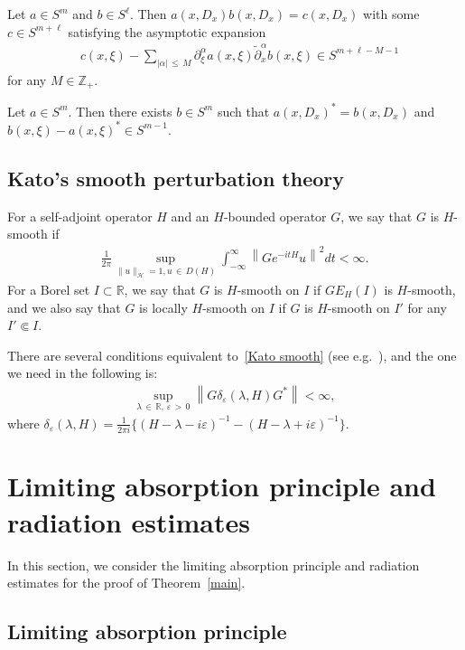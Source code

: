 \documentclass[10pt,a4paper]{amsart}
\renewcommand{\a}{\alpha}
\renewcommand{\d}{\delta}
\newcommand{\e}{\varepsilon}
\newcommand{\x}{\xi}
\newcommand{\R}{\mathbb{R}}
\newcommand{\Z}{\mathbb{Z}}
\newcommand{\HS}{\mathcal{H}}
\begin{document}
\begin{lemm}\label{composition lemma}
Let $a\in S^m$ and $b\in S^{\ell}$. Then $a(x,D_x)b(x,D_x)=c(x,D_x)$ with some $c\in S^{m+\ell}$ satisfying the asymptotic expansion
\begin{align*}
&c(x,\x) - \sum_{|\a|\,\leq\,M} \partial_{\x}^\a a(x,\x) \tilde\partial_{x}^\a b(x,\x) \in S^{m+\ell-M-1}
\end{align*}
for any $M\in\Z_+$.
\end{lemm}

\begin{lemm}\label{adjoint lemma}
Let $a\in S^m$. Then there exists $b\in S^m$ such that $a(x,D_x)^*=b(x,D_x)$ and $b(x,\x) - a(x,\x)^* \in S^{m-1}$.
\end{lemm}


\subsection{Kato's smooth perturbation theory} For a self-adjoint operator $H$ and an $H$-bounded operator $G$, we say that $G$ is $H$-smooth if
\begin{align}\label{Kato smooth}
\frac{1}{2\pi}\sup_{\|u\|_{\HS}=1,u\,\in\,D(H)} \int_{-\infty}^\infty \left\| Ge^{-itH}u \right\|^2 dt < \infty.
\end{align}
For a Borel set $I\subset\R$, we say that $G$ is $H$-smooth on $I$ if $GE_H(I)$ is $H$-smooth, and we also say that $G$ is locally $H$-smooth on $I$ if $G$ is $H$-smooth on $I'$ for any $I' \Subset I$.

There are several conditions equivalent to~\eqref{Kato smooth} (see e.g.~\cite{Yg}), and the one we need in the following is:
\begin{align}\label{Kato smooth 2}
\sup_{\lambda\,\in\,\R,\,\e\,>\,0} \left\|G\d_\e(\lambda,H)G^*\right\| <\infty,
\end{align}
where $\d_\e(\lambda,H)=\frac{1}{2\pi i}\{(H-\lambda-i\e)^{-1}-(H-\lambda+i\e)^{-1}\}$.


\section{Limiting absorption principle and radiation estimates}\label{Mourre section}

In this section, we consider the limiting absorption principle and radiation estimates for the proof of Theorem~\ref{main}.


\subsection{Limiting absorption principle}
\end{document}
